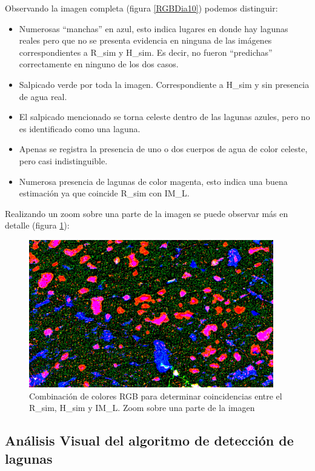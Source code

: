 \documentclass[10pt,a4paper, twoside]{report}
\begin{document}
Observando la imagen completa (figura \ref{RGBDia10}) podemos distinguir:

\begin{itemize}
	\item Numerosas "`manchas"' en azul, esto indica lugares en donde hay lagunas reales pero que no se presenta evidencia en ninguna de las imágenes correspondientes a R\_sim y H\_sim. Es decir, no fueron "`predichas"' correctamente en ninguno de los dos casos.
	\item Salpicado verde por toda la imagen. Correspondiente a H\_sim y sin presencia de agua real. 
	\item El salpicado mencionado se torna celeste dentro de las lagunas azules, pero no es identificado como una laguna.
	\item Apenas se registra la presencia de uno o dos cuerpos de agua de color celeste, pero casi indistinguible.
	\item Numerosa presencia de lagunas de color magenta, esto indica una buena estimación ya que coincide R\_sim con IM\_L.
\end{itemize}

Realizando un zoom sobre una parte de la imagen se puede observar más en detalle (figura \ref{RGBDia10Zoom}):

\begin{figure}[H]
   \centering      
   \includegraphics[width=0.95\textwidth]{imagenes/RGBDia10Zoom.jpg}
 \caption{Combinación de colores RGB para determinar coincidencias entre el R\_sim, H\_sim y IM\_L. Zoom sobre una parte de la imagen}
 \label{RGBDia10Zoom}
\end{figure}

\subsection{Análisis Visual del algoritmo de detección de lagunas}
\end{document}
